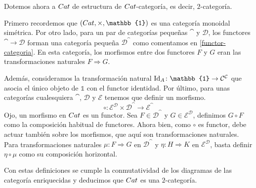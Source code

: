 \begin{example}\label{cat-2-categoria}
Dotemos ahora a ${Cat}$ de estructura de ${Cat}$-categoría, es decir, $2$-categoría.

Primero recordemos que $(\Cat, \times, \mathbb{1})$ es una categoría monoidal simétrica.
Por otro lado, para un par de categorías pequeñas $\cat$ y $\mathcal{D}$, los functores $\cat \to \mathcal{D}$ forman una categoría pequeña $\mathcal{D}^\cat$ como comentamos en \ref{functor-categoria}.
En esta categoría, los morfismos entre dos functores $F$ y $G$ eran las transformaciones naturales $F \Rightarrow G$.

Además, consideramos la transformación natural $\Id_A \colon \mathbb{1} \to \cat^\cat$ que asocia el único objeto de $\mathbb{1}$ con el functor identidad.
Por último, para unas categorías cualesquiera $\cat$, $\mathcal{D}$ y $\mathcal{E}$ tenemos que definir un morfismo.
\[ \circ \colon \mathcal{E}^\mathcal{D} \times \mathcal{D}^\cat \to \mathcal{E}^\cat\]
Ojo, un morfismo en ${Cat}$ es un functor.
Sea $F \in \mathcal{D}^\cat$ y $G \in \mathcal{E}^\mathcal{D}$, definimos $G \circ F$ como la composición habitual de functores.
Ahora bien, como $\circ$ es functor, debe actuar también sobre los morfismos, que aquí son transformaciones naturales.
Para transformaciones naturales $\mu \colon F \Rightarrow G$ en $\mathcal{D}^\cat$ y $\eta \colon H \Rightarrow K$ en $\mathcal{E}^\mathcal{D}$, basta definir $\eta \circ \mu$ como su composición horizontal.

Con estas definiciones se cumple la conmutatividad de los diagramas de las categoría enriquecidas y deducimos que ${Cat}$ es una $2$-categoría.
\end{example}

